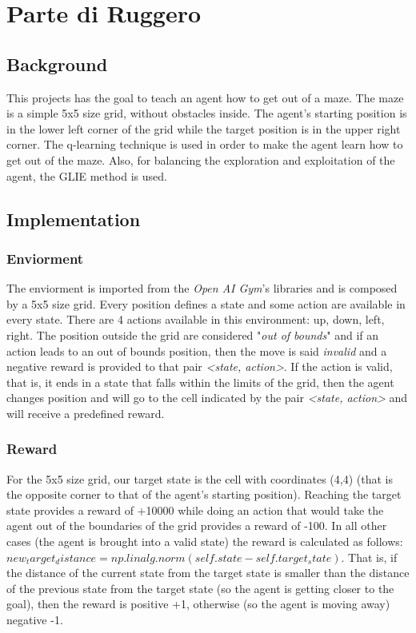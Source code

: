 \chapter{Parte di Ruggero}

\section{Background}
This projects has the goal to teach an agent how to get out of a maze. The maze is a simple 5x5 size grid, without obstacles inside.
The agent's starting position is in the lower left corner of the grid while the target position is in the upper right corner. The q-learning technique is used in order to make the agent learn how to get out of the maze. Also, for balancing the exploration and exploitation of the agent, the GLIE method is used. 

\section{Implementation}

\subsection{Enviorment}
The enviorment is imported from the \textit{Open AI Gym}'s libraries and is composed by a 5x5 size grid. Every position defines a state and some action are available in every state.
There are 4 actions available in this environment: up, down, left, right.
The position outside the grid are considered "\textit{out of bounds}" and if an action leads to an out of bounds position, then the move is said \textit{invalid} and a negative reward is provided to that pair \textit{<state, action>}.
If the action is valid, that is, it ends in a state that falls within the limits of the grid, then the agent changes position and will go to the cell indicated by the pair \textit{<state, action>} and will receive a predefined reward. 

\subsection{Reward}
For the 5x5 size grid, our target state is the cell with coordinates (4,4) (that is the opposite corner to that of the agent's starting position). Reaching the target state provides a reward of +10000 while doing an action that would take the agent out of the boundaries of the grid provides a reward of -100. 
In all other cases (the agent is brought into a valid state) the reward is calculated as follows: $new_target_distance = np.linalg.norm(self.state - self.target_state)$. That is, if the distance of the current state from the target state is smaller than the distance of the previous state from the target state (so the agent is getting closer to the goal), then the reward is positive +1, otherwise (so the agent is moving away) negative -1. \\

